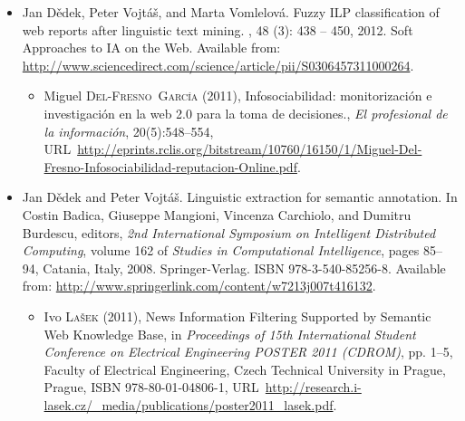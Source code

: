 \documentclass[12pt,a4paper,oneside,notitlepage]{article}
\newcommand{\urlprefix}{URL~}
\begin{document}
\begin{itemize}


\item
Jan D{\v{e}}dek, Peter Vojt{\'{a}}{\v{s}}, and Marta Vomlelov{\'{a}}.
\newblock Fuzzy {ILP} classification of web reports after linguistic text
  mining.
, 48 (3):
  438 -- 450, 2012.
\newblock Soft Approaches to IA on the Web.
\newblock Available from:
  \url{http://www.sciencedirect.com/science/article/pii/S0306457311000264}.

\begin{itemize}
\item
Miguel \textsc{Del-Fresno~Garc\'{\i}a} (2011), Infosociabilidad:
  monitorizaci\'{o}n e investigaci\'{o}n en la web 2.0 para la toma de
  decisiones., \emph{El profesional de la informaci\'{o}n}, 20(5):548--554,
  \urlprefix\url{http://eprints.rclis.org/bitstream/10760/16150/1/Miguel-Del-Fresno-Infosociabilidad-reputacion-Online.pdf}.
\end{itemize}





\item
Jan D{\v{e}}dek and Peter Vojt{\'{a}}{\v{s}}.
\newblock Linguistic extraction for semantic annotation.
\newblock In Costin Badica, Giuseppe Mangioni, Vincenza Carchiolo, and Dumitru
  Burdescu, editors, {\em 2nd International Symposium on Intelligent
  Distributed Computing}, volume 162 of {\em Studies in Computational
  Intelligence}, pages 85--94, Catania, Italy, 2008. Springer-Verlag.
\newblock ISBN 978-3-540-85256-8.
\newblock Available from:
  \url{http://www.springerlink.com/content/w7213j007t416132}.


\begin{itemize}
\item
Ivo \textsc{La\v{s}ek} (2011), News Information Filtering Supported by Semantic
  Web Knowledge Base, in \emph{{Proceedings of 15th International Student
  Conference on Electrical Engineering POSTER 2011 (CDROM)}}, pp. 1--5, Faculty
  of Electrical Engineering, Czech Technical University in Prague, Prague, ISBN 978-80-01-04806-1,
  \urlprefix\url{http://research.i-lasek.cz/_media/publications/poster2011_lasek.pdf}.


\end{itemize}
\end{itemize}
\end{document}
